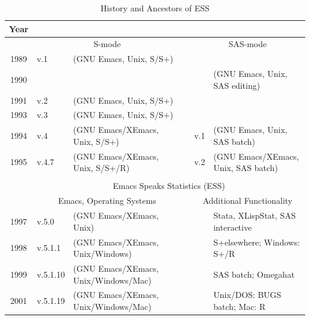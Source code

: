 \documentclass{article}
\begin{document}
\begin{table}[tbp]
  \centering
  {\scriptsize
  \begin{tabular}{c ll c ll}
\hline
    Year  \\
\hline
         & \multicolumn{2}{c}{S-mode}       && \multicolumn{2}{c}{SAS-mode} \\
\cline{2-3} \cline{5-6}
    1989 & v.1 & (GNU Emacs, Unix, S/S+)        &&  \\
    1990 &     &                            &&     & (GNU Emacs, Unix, SAS editing) \\
    1991 & v.2 & (GNU Emacs, Unix, S/S+)        && \\
    1993 & v.3 & (GNU Emacs, Unix, S/S+)        && \\
    1994 & v.4 & (GNU Emacs/XEmacs, Unix, S/S+) && v.1  & (GNU Emacs, Unix, SAS batch) \\
    1995 & v.4.7 & (GNU Emacs/XEmacs, Unix, S/S+/R) && v.2 & (GNU Emacs/XEmacs, Unix, SAS batch) \\
    \cline{2-6}\\[-3.5ex]
    \cline{2-6}
         & \multicolumn{5}{c}{Emacs Speaks Statistics (ESS)} \\
    \cline{2-6}
         &\multicolumn{2}{c}{Emacs, Operating Systems} &&\multicolumn{2}{c}{Additional Functionality}\\
\cline{2-3} \cline{5-6}
    1997 & v.5.0 & (GNU Emacs/XEmacs, Unix)         &&&  Stata, XLispStat, SAS interactive \\
    1998 & v.5.1.1 & (GNU Emacs/XEmacs, Unix/Windows) &&&  S+elsewhere; Windows: S+/R\\
    1999 & v.5.1.10 & (GNU Emacs/XEmacs, Unix/Windows/Mac) &&& SAS batch; Omegahat \\
    2001 & v.5.1.19 & (GNU Emacs/XEmacs, Unix/Windows/Mac) &&& Unix/DOS: BUGS batch; Mac: R \\
    \hline
  \end{tabular}
  }
  \caption{History and Ancestors of ESS}
  \label{tab:timeline}
\end{table}


\end{document}
